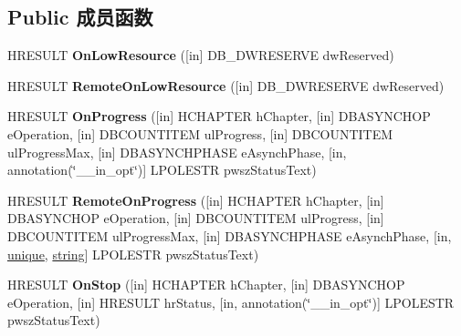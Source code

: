 \subsection*{Public 成员函数}
\begin{DoxyCompactItemize}
\item 
\mbox{\label{interface_i_d_b_asynch_notify_a02faf6089bfeffa0bd8290ece07dae2f}} 
H\+R\+E\+S\+U\+LT {\bfseries On\+Low\+Resource} (\mbox{[}in\mbox{]} D\+B\+\_\+\+D\+W\+R\+E\+S\+E\+R\+VE dw\+Reserved)
\item 
\mbox{\label{interface_i_d_b_asynch_notify_a29a7273107a2a564768e65371ced5a26}} 
H\+R\+E\+S\+U\+LT {\bfseries Remote\+On\+Low\+Resource} (\mbox{[}in\mbox{]} D\+B\+\_\+\+D\+W\+R\+E\+S\+E\+R\+VE dw\+Reserved)
\item 
\mbox{\label{interface_i_d_b_asynch_notify_a32251af6a2f4e425bc9f17aadd1eb37d}} 
H\+R\+E\+S\+U\+LT {\bfseries On\+Progress} (\mbox{[}in\mbox{]} H\+C\+H\+A\+P\+T\+ER h\+Chapter, \mbox{[}in\mbox{]} D\+B\+A\+S\+Y\+N\+C\+H\+OP e\+Operation, \mbox{[}in\mbox{]} D\+B\+C\+O\+U\+N\+T\+I\+T\+EM ul\+Progress, \mbox{[}in\mbox{]} D\+B\+C\+O\+U\+N\+T\+I\+T\+EM ul\+Progress\+Max, \mbox{[}in\mbox{]} D\+B\+A\+S\+Y\+N\+C\+H\+P\+H\+A\+SE e\+Asynch\+Phase, \mbox{[}in, annotation(\char`\"{}\+\_\+\+\_\+in\+\_\+opt\char`\"{})\mbox{]} L\+P\+O\+L\+E\+S\+TR pwsz\+Status\+Text)
\item 
\mbox{\label{interface_i_d_b_asynch_notify_ab8406194e2a0ef1cf1ef5e9e211818ae}} 
H\+R\+E\+S\+U\+LT {\bfseries Remote\+On\+Progress} (\mbox{[}in\mbox{]} H\+C\+H\+A\+P\+T\+ER h\+Chapter, \mbox{[}in\mbox{]} D\+B\+A\+S\+Y\+N\+C\+H\+OP e\+Operation, \mbox{[}in\mbox{]} D\+B\+C\+O\+U\+N\+T\+I\+T\+EM ul\+Progress, \mbox{[}in\mbox{]} D\+B\+C\+O\+U\+N\+T\+I\+T\+EM ul\+Progress\+Max, \mbox{[}in\mbox{]} D\+B\+A\+S\+Y\+N\+C\+H\+P\+H\+A\+SE e\+Asynch\+Phase, \mbox{[}in, \hyperlink{interfaceunique}{unique}, \hyperlink{structstring}{string}\mbox{]} L\+P\+O\+L\+E\+S\+TR pwsz\+Status\+Text)
\item 
\mbox{\label{interface_i_d_b_asynch_notify_a1742c75151d8c9cbf7dca59a03cfdfb1}} 
H\+R\+E\+S\+U\+LT {\bfseries On\+Stop} (\mbox{[}in\mbox{]} H\+C\+H\+A\+P\+T\+ER h\+Chapter, \mbox{[}in\mbox{]} D\+B\+A\+S\+Y\+N\+C\+H\+OP e\+Operation, \mbox{[}in\mbox{]} H\+R\+E\+S\+U\+LT hr\+Status, \mbox{[}in, annotation(\char`\"{}\+\_\+\+\_\+in\+\_\+opt\char`\"{})\mbox{]} L\+P\+O\+L\+E\+S\+TR pwsz\+Status\+Text)

\end{DoxyCompactItemize}
